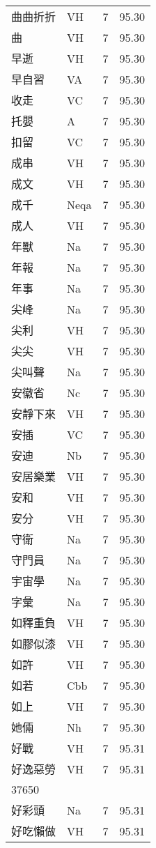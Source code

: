 \documentclass[twocolumn]{book}
\begin{document}
\begin{supertabular}{llrr}
曲曲折折 & VH & 7 &  95.30\\
曲 & VH & 7 &  95.30\\
早逝 & VH & 7 &  95.30\\
早自習 & VA & 7 &  95.30\\
收走 & VC & 7 &  95.30\\
托嬰 & A & 7 &  95.30\\
扣留 & VC & 7 &  95.30\\
成串 & VH & 7 &  95.30\\
成文 & VH & 7 &  95.30\\
成千 & Neqa & 7 &  95.30\\
成人 & VH & 7 &  95.30\\
年獸 & Na & 7 &  95.30\\
年報 & Na & 7 &  95.30\\
年事 & Na & 7 &  95.30\\
尖峰 & Na & 7 &  95.30\\
尖利 & VH & 7 &  95.30\\
尖尖 & VH & 7 &  95.30\\
尖叫聲 & Na & 7 &  95.30\\
安徽省 & Nc & 7 &  95.30\\
安靜下來 & VH & 7 &  95.30\\
安插 & VC & 7 &  95.30\\
安迪 & Nb & 7 &  95.30\\
安居樂業 & VH & 7 &  95.30\\
安和 & VH & 7 &  95.30\\
安分 & VH & 7 &  95.30\\
守衛 & Na & 7 &  95.30\\
守門員 & Na & 7 &  95.30\\
宇宙學 & Na & 7 &  95.30\\
字彙 & Na & 7 &  95.30\\
如釋重負 & VH & 7 &  95.30\\
如膠似漆 & VH & 7 &  95.30\\
如許 & VH & 7 &  95.30\\
如若 & Cbb & 7 &  95.30\\
如上 & VH & 7 &  95.30\\
她倆 & Nh & 7 &  95.30\\
好戰 & VH & 7 &  95.31\\
好逸惡勞 & VH & 7 &  95.31\\
37650\\
好彩頭 & Na & 7 &  95.31\\
好吃懶做 & VH & 7 &  95.31\\

\end{supertabular}
\end{document}
